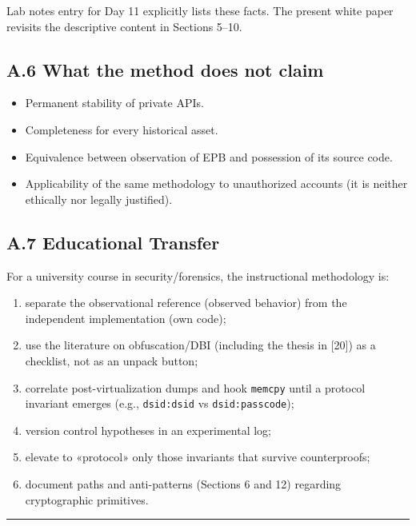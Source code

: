 \documentclass[
  english,
  10pt]{article}
\providecommand{\tightlist}{%
  \setlength{\itemsep}{0pt}\setlength{\parskip}{0pt}}
\begin{document}
Lab notes entry for Day 11 explicitly lists these facts. The present
white paper revisits the descriptive content in Sections 5--10.

\subsection{A.6 What the method does not
claim}\label{a.6-what-the-method-does-not-claim}

\begin{itemize}
\tightlist
\item
  Permanent stability of private APIs.
\item
  Completeness for every historical asset.
\item
  Equivalence between observation of EPB and possession of its source
  code.
\item
  Applicability of the same methodology to unauthorized accounts (it is
  neither ethically nor legally justified).
\end{itemize}

\subsection{A.7 Educational Transfer}\label{a.7-educational-transfer}

For a university course in security/forensics, the instructional
methodology is:

\begin{enumerate}
\def\labelenumi{\arabic{enumi}.}
\tightlist
\item
  separate the observational reference (observed behavior) from the
  independent implementation (own code);
\item
  use the literature on obfuscation/DBI (including the thesis in
  {[}20{]}) as a checklist, not as an unpack button;
\item
  correlate post-virtualization dumps and hook \texttt{memcpy} until a
  protocol invariant emerges (e.g., \texttt{dsid:dsid} vs
  \texttt{dsid:passcode});
\item
  version control hypotheses in an experimental log;
\item
  elevate to «protocol» only those invariants that survive
  counterproofs;
\item
  document paths and anti-patterns (Sections 6 and 12) regarding
  cryptographic primitives.
\end{enumerate}

\begin{center}\rule{0.5\linewidth}{0.5pt}\end{center}
\end{document}
